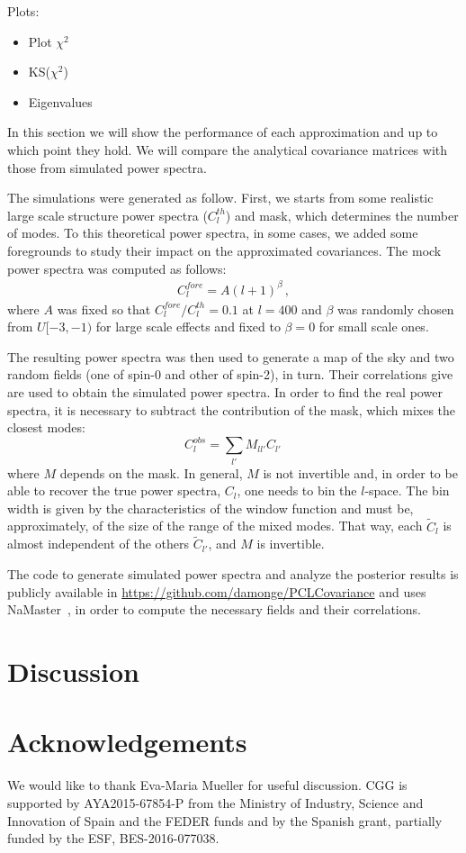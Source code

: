 \documentclass[useAMS,usenatbib]{mn2e}
\newcommand{\clth}{C_l^{th}}
\newcommand{\clf}{C_l^{fore}}
\begin{document}
Plots:
\begin{itemize}
\item Plot $\chi^2$
\item KS($\chi^2$)
\item Eigenvalues
\end{itemize}

In this section we will show the performance of each approximation and up to
which point they hold. We will compare the analytical covariance matrices with
those from simulated power spectra. 

The simulations were generated as follow. First, we starts from some realistic
large scale structure power spectra ($\clth$) and mask, which determines the
number of modes. To this theoretical power spectra, in some cases, we
added some foregrounds to study their impact on the approximated covariances.
The mock power spectra was computed as follows:
\begin{eqnarray}
  \clf = A (l + 1)^\beta\,,
\end{eqnarray}
where $A$ was fixed so that $\clf/\clth = 0.1$ at $l=400$ and $\beta$ was
randomly chosen from $U[-3, -1)$ for large scale effects and fixed to $\beta =
0$ for small scale ones.

The resulting power spectra was then used to generate a map of the sky and
two random fields (one of spin-0 and other of spin-2), in turn. Their
correlations give  are used to obtain the simulated power spectra. In order to
find the real power spectra, it is necessary to subtract the contribution of
the mask, which mixes the closest modes:
\begin{equation}
  C^{obs}_l = \sum_{l'} M_{ll'} C_{l'}\,
\end{equation}
where $M$ depends on the mask. In general, $M$ is not invertible and, in order
to be able to recover the true power spectra, $C_l$, one needs to bin the
$l$-space. The bin width is given by the characteristics of the window
function and must be, approximately, of the size of the range of the mixed
modes. That way, each $\tilde C_l$ is almost independent of the others
$\tilde C_{l'}$, and $M$ is invertible.

The code to generate simulated power spectra and analyze the posterior
results is publicly available in
\url{https://github.com/damonge/PCLCovariance} and uses
NaMaster~\cite{2018arXiv180909603A}, in order to compute the necessary fields
and their correlations. 


\section{Discussion}\label{sec:discussion}


\section*{Acknowledgements}
We would like to thank Eva-Maria Mueller for useful discussion. CGG is
supported by AYA2015-67854-P from the Ministry of Industry, Science and
Innovation of Spain and the FEDER funds and by the Spanish grant, partially
funded by the ESF, BES-2016-077038.

\setlength{\bibhang}{2.0em}
\setlength{}

\end{document}
